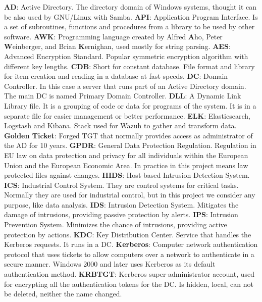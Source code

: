 \textbf{AD}: Active Directory. The directory domain of Windows systems, thought it can be also used by GNU/Linux with Samba.
\linej
\linej
\textbf{API}: Application Program Interface. Is a set of subroutines, functions and procedures from a library to be used by other software.
\linej
\linej
\textbf{AWK}: Programming language created by Alfred \textbf{A}ho, Peter \textbf{W}einberger, and Brian \textbf{K}ernighan, used mostly for string parsing.
\linej
\linej
\textbf{AES}: Advanced Encryption Standard. Popular symmetric encryption algorithm with different key lengths.
\linej
\linej
\textbf{CDB}: Short for constant database. File format and library for item creation and reading in a database at fast speeds.
\linej
\linej
\textbf{DC}: Domain Controller. In this case a server that runs part of an Active Directory domain. The main DC is named Primary Domain Controller.
\linej
\linej
\textbf{DLL}: A Dynamic Link Library file. It is a grouping of code or data for programs of the system. It is in a separate file for easier management or better performance.
\linej
\linej
\textbf{ELK}: Elasticsearch, Logstash and Kibana. Stack used for Wazuh to gather and transform data.
\linej
\linej
\textbf{Golden Ticket}: Forged TGT that normally provides access as administrator of the AD for 10 years.
\linej
\linej
\textbf{GPDR}: General Data Protection Regulation. Regulation in EU law on data protection and privacy for all individuals within the European Union and the European Economic Area. In practice in this project means law protected files against changes.
\linej
\linej
\textbf{HIDS}: Host-based Intrusion Detection System.
\linej
\linej
\textbf{ICS}: Industrial Control System. They are control systems for critical tasks. Normally they are used for industrial control, but in this project we consider any purpose, like data analysis.
\linej
\linej
\textbf{IDS}: Intrusion Detection System. Mitigates the damage of intrusions, providing passive protection by alerts.
\linej
\linej
\textbf{IPS}: Intrusion Prevention System. Minimizes the chance of intrusions, providing active protection by actions.
\linej
\linej
\textbf{KDC}: Key Distribution Center. Service that handles the Kerberos requests. It runs in a DC.
\linej
\linej
\textbf{Kerberos}: Computer network authentication protocol that uses tickets to allow computers over a network to authenticate in a secure manner. Windows 2000 and later uses Kerberos as its default authentication method.
\linej
\linej
\textbf{KRBTGT}: Kerberos super-administrator account, used for encrypting all the authentication tokens for the DC. Is hidden, local, can not be deleted, neither the name changed.
